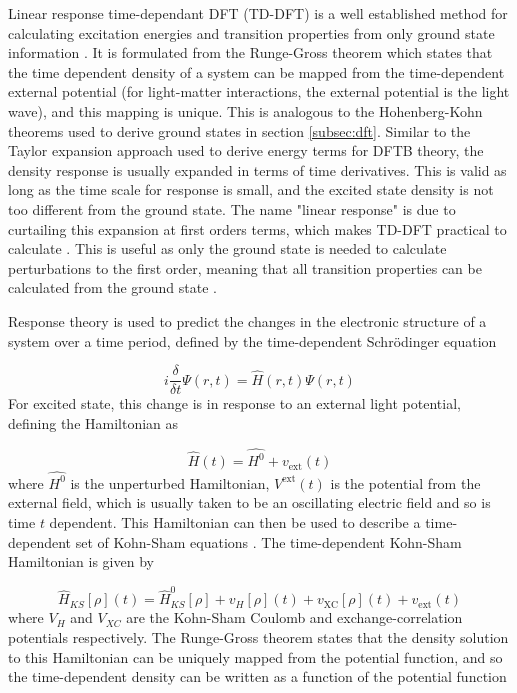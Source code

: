 Linear response time-dependant DFT (TD-DFT) is a well established method for calculating
excitation energies and transition properties from only ground state information \cite{Laurent2013}. 
It is formulated from the Runge-Gross theorem \cite{Runge1984} which states that the
time dependent density of a system can be mapped from the time-dependent external 
potential (for light-matter interactions, the external potential is the light wave), 
and this mapping is unique. This is analogous to the Hohenberg-Kohn theorems used
to derive ground states in section \ref{subsec:dft}. Similar to the Taylor expansion
approach used to derive energy terms for DFTB theory, the density response is usually
expanded in terms of time derivatives. This is valid as long as the time scale for 
response is small, and the excited state density is not too different from the ground
state. The name "linear response" is due to curtailing this expansion at first orders 
terms, which makes TD-DFT practical to calculate \cite{Marques2004}. This is useful
as only the ground state is needed to calculate perturbations to the first order, 
meaning that all transition properties can be calculated from the ground state \cite{Marques2004}.

Response theory is used to predict the changes in the electronic structure of a 
system over a time period, defined by the time-dependent Schr\"{o}dinger equation

\begin{equation}
    i \frac{\delta}{\delta t} \Psi\left(r, t\right) = \hat{H}\left(r, t\right) \Psi\left(r, t\right)
\end{equation}
%
For excited state, this change is in response to an external light potential, defining
the Hamiltonian as

\begin{equation}
\hat{H}\left(t\right) = \hat{H^0} + v_{\text{ext}}\left(t\right)
\end{equation}
%
where $\hat{H^0}$ is the unperturbed Hamiltonian, $V^{\text{ext}}\left(t\right)$ 
is the potential from the external field, which is usually taken to be an oscillating 
electric field and so is time $t$ dependent. This Hamiltonian can then be used to 
describe a time-dependent set of Kohn-Sham equations \cite{Kohn1964}. The time-dependent
Kohn-Sham Hamiltonian is given by

\begin{equation}
\hat{H}_{KS}\left[\rho\right]\left(t\right) = \hat{H}^0_{KS}\left[\rho\right] + v_H\left[\rho\right]\left(t\right) + v_{\text{XC}}\left[\rho\right]\left(t\right) + v_{\text{ext}}\left(t\right)
\end{equation} 
%
where $V_H$ and $V_{XC}$ are the Kohn-Sham Coulomb and exchange-correlation potentials 
respectively. The Runge-Gross theorem states that the density solution to this Hamiltonian
can be uniquely mapped from the potential function, and so the time-dependent density 
can be written as a function of the potential function


